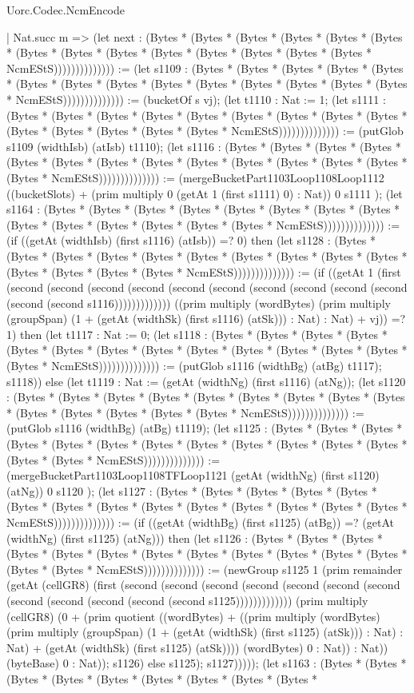 \begin{lexlean}{Uorc.Codec.NcmEncode}
\begin{semanticmodule}
{    | Nat.succ m => (let next : (Bytes * (Bytes * (Bytes * (Bytes * (Bytes * (Bytes * (Bytes * (Bytes * (Bytes * (Bytes * (Bytes * (Bytes * (Bytes * (Bytes * NcmEStS)))))))))))))) := (let s1109 : (Bytes * (Bytes * (Bytes * (Bytes * (Bytes * (Bytes * (Bytes * (Bytes * (Bytes * (Bytes * (Bytes * (Bytes * (Bytes * (Bytes * NcmEStS)))))))))))))) := (bucketOf s vj); (let t1110 : Nat := 1; (let s1111 : (Bytes * (Bytes * (Bytes * (Bytes * (Bytes * (Bytes * (Bytes * (Bytes * (Bytes * (Bytes * (Bytes * (Bytes * (Bytes * (Bytes * NcmEStS)))))))))))))) := (putGlob s1109 (widthIsb) (atIsb) t1110); (let s1116 : (Bytes * (Bytes * (Bytes * (Bytes * (Bytes * (Bytes * (Bytes * (Bytes * (Bytes * (Bytes * (Bytes * (Bytes * (Bytes * (Bytes * NcmEStS)))))))))))))) := (mergeBucketPart1103Loop1108Loop1112 ((bucketSlots) + (prim multiply 0 (getAt 1 (first s1111) 0) : Nat)) 0 s1111 ); (let s1164 : (Bytes * (Bytes * (Bytes * (Bytes * (Bytes * (Bytes * (Bytes * (Bytes * (Bytes * (Bytes * (Bytes * (Bytes * (Bytes * (Bytes * NcmEStS)))))))))))))) := (if ((getAt (widthIsb) (first s1116) (atIsb)) =? 0) then (let s1128 : (Bytes * (Bytes * (Bytes * (Bytes * (Bytes * (Bytes * (Bytes * (Bytes * (Bytes * (Bytes * (Bytes * (Bytes * (Bytes * (Bytes * NcmEStS)))))))))))))) := (if ((getAt 1 (first (second (second (second (second (second (second (second (second (second (second (second (second s1116))))))))))))) ((prim multiply (wordBytes) (prim multiply (groupSpan) (1 + (getAt (widthSk) (first s1116) (atSk))) : Nat) : Nat) + vj)) =? 1) then (let t1117 : Nat := 0; (let s1118 : (Bytes * (Bytes * (Bytes * (Bytes * (Bytes * (Bytes * (Bytes * (Bytes * (Bytes * (Bytes * (Bytes * (Bytes * (Bytes * (Bytes * NcmEStS)))))))))))))) := (putGlob s1116 (widthBg) (atBg) t1117); s1118)) else (let t1119 : Nat := (getAt (widthNg) (first s1116) (atNg)); (let s1120 : (Bytes * (Bytes * (Bytes * (Bytes * (Bytes * (Bytes * (Bytes * (Bytes * (Bytes * (Bytes * (Bytes * (Bytes * (Bytes * (Bytes * NcmEStS)))))))))))))) := (putGlob s1116 (widthBg) (atBg) t1119); (let s1125 : (Bytes * (Bytes * (Bytes * (Bytes * (Bytes * (Bytes * (Bytes * (Bytes * (Bytes * (Bytes * (Bytes * (Bytes * (Bytes * (Bytes * NcmEStS)))))))))))))) := (mergeBucketPart1103Loop1108TFLoop1121 (getAt (widthNg) (first s1120) (atNg)) 0 s1120 ); (let s1127 : (Bytes * (Bytes * (Bytes * (Bytes * (Bytes * (Bytes * (Bytes * (Bytes * (Bytes * (Bytes * (Bytes * (Bytes * (Bytes * (Bytes * NcmEStS)))))))))))))) := (if ((getAt (widthBg) (first s1125) (atBg)) =? (getAt (widthNg) (first s1125) (atNg))) then (let s1126 : (Bytes * (Bytes * (Bytes * (Bytes * (Bytes * (Bytes * (Bytes * (Bytes * (Bytes * (Bytes * (Bytes * (Bytes * (Bytes * (Bytes * NcmEStS)))))))))))))) := (newGroup s1125 1 (prim remainder (getAt (cellGR8) (first (second (second (second (second (second (second (second (second (second (second (second (second s1125))))))))))))) (prim multiply (cellGR8) (0 + (prim quotient ((wordBytes) + ((prim multiply (wordBytes) (prim multiply (groupSpan) (1 + (getAt (widthSk) (first s1125) (atSk))) : Nat) : Nat) + (getAt (widthSk) (first s1125) (atSk)))) (wordBytes) 0 : Nat)) : Nat)) (byteBase) 0 : Nat)); s1126) else s1125); s1127))))); (let s1163 : (Bytes * (Bytes * (Bytes * (Bytes * (Bytes * (Bytes * (Bytes * (Bytes * (Bytes * }
\end{semanticmodule}
\end{lexlean}
